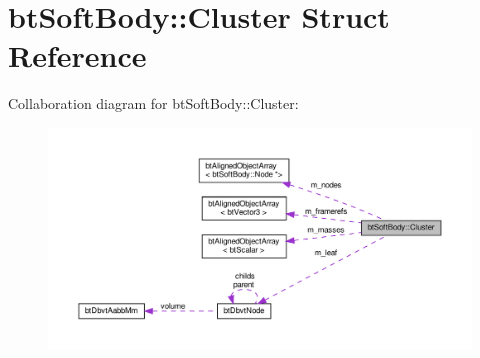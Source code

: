 \hypertarget{structbtSoftBody_1_1Cluster}{}\section{bt\+Soft\+Body\+:\+:Cluster Struct Reference}
\label{structbtSoftBody_1_1Cluster}


Collaboration diagram for bt\+Soft\+Body\+:\+:Cluster\+:
\nopagebreak
\begin{figure}[H]
\begin{center}
\leavevmode
\includegraphics[width=350pt]{structbtSoftBody_1_1Cluster__coll__graph}
\end{center}
\end{figure}
